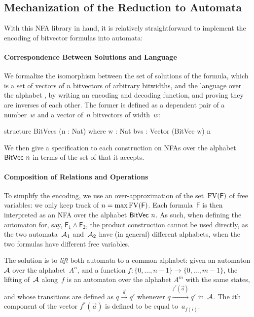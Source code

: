\subsection{Mechanization of the Reduction to Automata}

With this NFA library in hand, it is relatively straightforward to implement the
encoding of bitvector formulas into automata:

\paragraph{Correspondence Between Solutions and Language}

We formalize the isomorphism between the set of solutions of the
formula, which is a set of vectors of $n$ bitvectors of arbitrary bitwidths,
and the language over the alphabet , by writing an encoding
and decoding function, and proving they are inverses of each other.
%
The former is defined as a dependent pair of a number~$w$ and a vector of~$n$
bitvectors of width~$w$:
%
\begin{lean}
 structure BitVecs (n : Nat) where
  w : Nat
  bvs : Vector (BitVec w) n
\end{lean}
%
We then give a specification to each construction on NFAs over the alphabet~$\mathsf{BitVec}~{n}$ in terms of the set of  that it accepts.

\paragraph{Composition of Relations and Operations}

To simplify the encoding, we use an over-approximation of the set~$\mathrm{FV}(\mathsf
F)$ of free variables: we only keep track of $n = \max \mathrm{FV}(\mathsf F)$.
%
Each formula~$\textsf{F}$ is then interpreted as an NFA over the alphabet $\mathsf{BitVec}~{n}$. As such, when defining the automaton for, say, $\mathsf F_1 \land \mathsf
F_2$, the product construction cannot be used directly, as the two
automata~$\mathcal{A}_1$ and~$\mathcal{A}_2$ have (in general) different alphabets, when the
two formulas have different free variables.
%

The solution is to \emph{lift} both automata to a common alphabet: given an
automaton $\mathcal{A}$ over the alphabet~$A^n$, and a function $f : \{0, \dots, n-1\}
\to \{0, \dots, m-1\}$, the lifting of~$\mathcal{A}$ along~$f$ is an automaton over the
alphabet $A^m$ with the same states, and whose transitions are defined as $q
\xrightarrow{\vec{a}} q'$ whenever $q \xrightarrow{f^*(\vec{a})} q'$ in~$\mathcal{A}$.
%
The $i$th component of the vector $f^*(\vec{a})$ is defined to be equal
to~$a_{f(i)}$.

